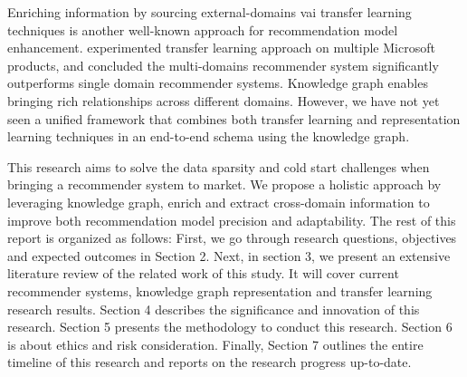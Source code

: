 Enriching information by sourcing external-domains vai transfer learning techniques \citep{Pan2010} is another well-known approach for recommendation model enhancement. \citet{Elkahky2015} experimented transfer learning approach on multiple Microsoft products, and concluded the multi-domains recommender system significantly outperforms single domain recommender systems. Knowledge graph enables bringing rich relationships across different domains. However, we have not yet seen a unified framework that combines both transfer learning and representation learning techniques in an end-to-end schema using the knowledge graph.

This research aims to solve the data sparsity and cold start challenges when bringing a recommender system to market. We propose a holistic approach by leveraging knowledge graph, enrich and extract cross-domain information to improve both recommendation model precision and adaptability. The rest of this report is organized as follows: 
First, we go through research questions, objectives and expected outcomes in Section 2. Next, in section 3, we present an extensive literature review of the related work of this study. It will cover current recommender systems, knowledge graph representation and transfer learning research results. Section 4 describes the significance and innovation of this research. Section 5 presents the methodology to conduct this research. Section 6 is about ethics and risk consideration. Finally, Section 7 outlines the entire timeline of this research and reports on the research progress up-to-date.